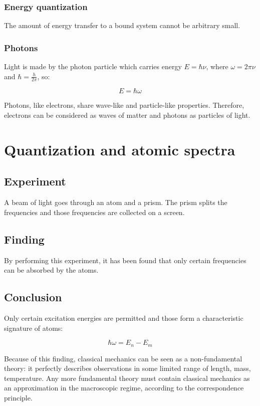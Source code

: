     \subsubsection{Energy quantization}
    The amount of energy transfer to a bound system cannot be arbitrary small.

    \subsubsection{Photons}
    Light is made by the photon particle which carries energy $E = \hbar\nu$, where $\omega = 2\pi\nu$ and $\hbar = \frac{h}{2\pi}$, so:

    $$E = \hbar\omega$$

    Photons, like electrons, share wave-like and particle-like properties.
    Therefore, electrons can be considered as waves of matter and photons as particles of light.

\section{Quantization and atomic spectra}

  \subsection{Experiment}
  A beam of light goes through an atom and a prism.
  The prism splits the frequencies and those frequencies are collected on a screen.

  \subsection{Finding}
  By performing this experiment, it has been found that only certain frequencies can be absorbed by the atoms.

  \subsection{Conclusion}
  Only certain excitation energies are permitted and those form a characteristic signature of atoms:

  $$\hbar\omega = E_n-E_m$$

  Because of this finding, classical mechanics can be seen as a non-fundamental theory: it perfectly describes observations in some limited range of length, mass, temperature.
  Any more fundamental theory must contain classical mechanics as an approximation in the macroscopic regime, according to the correspondence principle.

